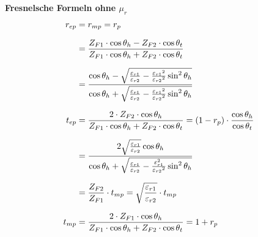 \textbf{Fresnelsche Formeln ohne $\mu_r$}
\begin{equation*}
		\setlength{\jot}{10pt}
	\begin{aligned}
		r_{ep}    & =  r_{mp} = r_{p} 
		\\
		& = \frac{Z_{F1} \cdot \cos \theta_h-Z_{F2} \cdot \cos \theta_t}{Z_{F1} \cdot \cos \theta_h+Z_{F2} \cdot \cos \theta_t}
		\\
		& =\frac{\cos \theta_h-\sqrt{\frac{\varepsilon_{r 1}}{\varepsilon_{r 2}}-\frac{\varepsilon_{r 1}{ }^2}{\varepsilon_{r 2}{ }^2} \sin ^2 \theta_h}}{\cos \theta_h+\sqrt{\frac{\varepsilon_{r 1}}{\varepsilon_{r 2}}-\frac{\varepsilon_{r 1}{ }^2}{\varepsilon_{r 2}{ }^2} \sin ^2 \theta_h}} \\
		t_{ep} & =  \frac{2 \cdot Z_{F2}   \cdot  \cos \theta_h}{Z_{F1} \cdot \cos \theta_h+Z_{F2} \cdot \cos \theta_t}                                                                                                                           = (1-r_p) \cdot \dfrac{\cos \theta_h}{\cos \theta_t}                                                                                                                                                                        \\
		& = \frac{2 \sqrt{\frac{\varepsilon_{r 1}}{\varepsilon_{r 2}}} \cos \theta_h}{\cos \theta_h+\sqrt{\frac{\varepsilon_{r 1}}{\varepsilon_{r 2}}-\frac{\varepsilon_{r 1}^2}{\varepsilon_{r 2}{ }^2} \sin ^2 \theta_h}} \\
		& = \frac{Z_{F2}}{Z_{F1}}\cdot t_{mp} = \sqrt{\frac{\varepsilon_{r1}}{\varepsilon_{r2}}}\cdot t_{mp} \\
		t_{mp} & = \frac{2 \cdot  Z_{F1}\cdot \cos \theta_h}{Z_{F1} \cdot \cos \theta_h+Z_{F2} \cdot \cos \theta_t}                                                                                                                          
		= 1+r_p                                                                                                                                                                                                                
	\end{aligned}
\end{equation*}

